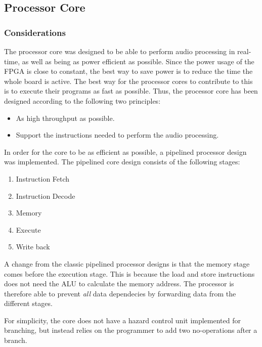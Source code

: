 \FloatBarrier
\subsection{Processor Core}\label{subsec:fpga-processor-core}

\subsubsection{Considerations}

The processor core was designed to be able to perform audio processing in real-time, as well as being as power efficient as possible. Since the power usage of the FPGA is close to constant, the best way to save power is to reduce the time the whole board is active. The best way for the processor cores to contribute to this is to execute their programs as fast as possible. Thus, the processor core has been designed according to the following two principles:

\begin{itemize}
	\item As high throughput as possible.
	\item Support the instructions needed to perform the audio processing.
\end{itemize}

In order for the core to be as efficient as possible, a pipelined processor
design was implemented. The pipelined core design consists of the following
stages:

\begin{enumerate}
	\item Instruction Fetch \label{stage:if}
	\item Instruction Decode \label{stage:id}
	\item Memory \label{stage:mem}
	\item Execute \label{stage:ex}
	\item Write back \label{stage:wb}
\end{enumerate}

A change from the classic pipelined processor designs is that the memory stage comes before the execution stage. This is because the load and store instructions does not need the ALU to calculate the memory address. The processor is therefore able to prevent \textit{all} data dependecies by forwarding data from the different stages.

For simplicity, the core does not have a hazard control unit implemented for
branching, but instead relies on the programmer to add two no-operations after a
branch.

